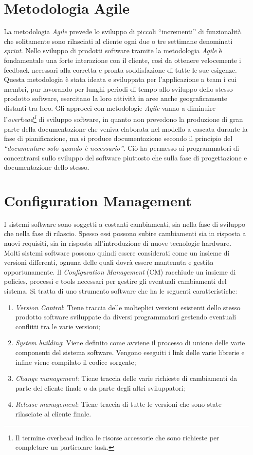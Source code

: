 \section{Metodologia Agile}
La metodologia \emph{Agile} prevede lo sviluppo di piccoli “incrementi” di funzionalità che solitamente sono rilasciati al cliente ogni due o tre settimane denominati \emph{sprint}. Nello sviluppo di prodotti software tramite la metodologia \emph{Agile}
è fondamentale una forte interazione con il cliente, così da ottenere velocemente i feedback necessari alla corretta e pronta soddisfazione di tutte le sue esigenze.
Questa metodologia è stata ideata e sviluppata per l’applicazione a team i cui membri, pur lavorando per lunghi periodi di tempo allo sviluppo dello stesso prodotto software, esercitano la loro attività in aree anche geograficamente distanti tra loro. Gli approcci con metodologie \emph{Agile} vanno a diminuire l’\emph{overhead\footnote{Il termine overhead indica le risorse accessorie che sono richieste per completare un particolare task.}} di sviluppo software, in quanto non prevedono la produzione di gran parte della documentazione che veniva elaborata nel modello a cascata durante la fase di pianificazione, ma si produce documentazione secondo il principio del \emph{“documentare solo quando è necessario”}. Ciò ha permesso ai programmatori di
concentrarsi sullo sviluppo del software piuttosto che sulla fase di progettazione e documentazione dello stesso.
\section{Configuration Management}
\cite{sommerville2011software}I sistemi software sono soggetti a costanti cambiamenti, sia nella fase di
sviluppo che nella fase di rilascio. Spesso essi possono subire cambiamenti sia in risposta a nuovi requisiti, sia in risposta all’introduzione di nuove tecnologie
hardware. Molti sistemi software possono quindi essere considerati come un insieme di versioni differenti, ognuna delle quali dovrà essere mantenuta e gestita
opportunamente.
Il \emph{Configuration Management} (CM) racchiude un insieme di policies, processi e tools necessari per gestire gli eventuali cambiamenti del sistema. Si tratta di uno strumento software che ha le seguenti caratteristiche:
\begin{enumerate}
	\item \emph{Version Control}: Tiene traccia delle molteplici versioni esistenti dello stesso prodotto software sviluppate da diversi programmatori gestendo eventuali conflitti tra le varie versioni;
	\item \emph{System building}: Viene definito come avviene il processo di unione delle varie componenti del sistema software. Vengono eseguiti i link delle varie librerie e infine viene compilato il codice sorgente;
	\item \emph{Change management}: Tiene traccia delle varie richieste di cambiamenti da parte del cliente finale o da parte degli altri sviluppatori;
	\item \emph{Release management}: Tiene traccia di tutte le versioni che sono state rilasciate al cliente finale.
\end{enumerate}
